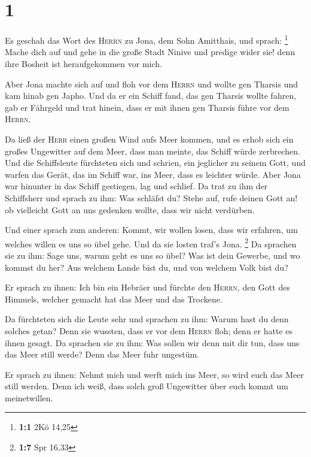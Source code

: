 \hypertarget{section}{%
\section{1}\label{section}}

 Es geschah das Wort des \textsc{Herrn} zu Jona, dem Sohn
Amitthais, und sprach: \footnote{\textbf{1:1} 2Kö 14,25} 
Mache dich auf und gehe in die große Stadt Ninive und predige wider sie!
denn ihre Bosheit ist heraufgekommen vor mich.

 Aber Jona machte sich auf und floh vor dem \textsc{Herrn}
und wollte gen Tharsis und kam hinab gen Japho. Und da er ein Schiff
fand, das gen Tharsis wollte fahren, gab er Fährgeld und trat hinein,
dass er mit ihnen gen Tharsis führe vor dem \textsc{Herrn}.

 Da ließ der \textsc{Herr} einen großen Wind aufs Meer
kommen, und es erhob sich ein großes Ungewitter auf dem Meer, dass man
meinte, das Schiff würde zerbrechen.  Und die Schiffsleute
fürchteten sich und schrien, ein jeglicher zu seinem Gott, und warfen
das Gerät, das im Schiff war, ins Meer, dass es leichter würde. Aber
Jona war hinunter in das Schiff gestiegen, lag und schlief.
 Da trat zu ihm der Schiffsherr und sprach zu ihm: Was
schläfst du? Stehe auf, rufe deinen Gott an! ob vielleicht Gott an uns
gedenken wollte, dass wir nicht verdürben.

 Und einer sprach zum anderen: Kommt, wir wollen losen,
dass wir erfahren, um welches willen es uns so übel gehe. Und da sie
losten traf's Jona. \footnote{\textbf{1:7} Spr 16,33}  Da
sprachen sie zu ihm: Sage uns, warum geht es uns so übel? Was ist dein
Gewerbe, und wo kommst du her? Aus welchem Lande bist du, und von
welchem Volk bist du?

 Er sprach zu ihnen: Ich bin ein Hebräer und fürchte den
\textsc{Herrn}, den Gott des Himmels, welcher gemacht hat das Meer und
das Trockene.

 Da fürchteten sich die Leute sehr und sprachen zu ihm:
Warum hast du denn solches getan? Denn sie wussten, dass er vor dem
\textsc{Herrn} floh; denn er hatte es ihnen gesagt.  Da
sprachen sie zu ihm: Was sollen wir denn mit dir tun, dass uns das Meer
still werde? Denn das Meer fuhr ungestüm.

 Er sprach zu ihnen: Nehmt mich und werft mich ins Meer,
so wird euch das Meer still werden. Denn ich weiß, dass solch groß
Ungewitter über euch kommt um meinetwillen.

